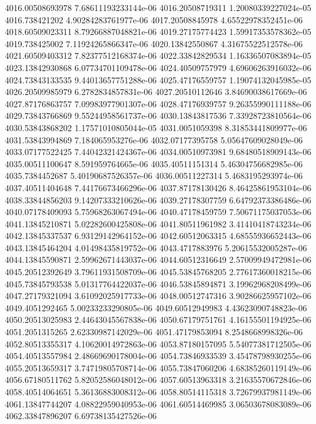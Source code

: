 {4016.00508693978 7.68611193233144e-06
4016.20508719311 1.20080339227024e-05
4016.738421202 4.90284283761977e-06
4017.20508845978 4.65522978352451e-06
4018.60509023311 8.79266887048821e-06
4019.27175774423 1.59917353578362e-05
4019.738425002 7.11924265866347e-06
4020.13842550867 4.31675522512578e-06
4021.60509403312 7.82377512168374e-06
4022.33842829534 1.16336507083894e-05
4023.13842930868 6.07734701109478e-06
4024.40509757979 4.69606263916032e-06
4024.73843133535 9.44013657751288e-06
4025.47176559757 1.19074132045985e-05
4026.20509985979 6.2782834857831e-06
4027.20510112646 3.84690038617669e-06
4027.87176863757 7.09983977901307e-06
4028.47176939757 9.26355990111188e-06
4029.73843766869 9.55244958561737e-06
4030.13843817536 7.33928723810564e-06
4030.53843868202 1.17571010805044e-05
4031.0051059398 8.31853441809977e-06
4031.53843994869 7.184065953276e-06
4032.07177395758 5.05647609028049e-06
4033.07177522425 7.44042321424367e-06
4034.00510973981 9.68480518909143e-06
4035.00511100647 8.591959764665e-06
4035.40511151314 5.46304756682985e-06
4035.7384452687 5.40190687526357e-06
4036.00511227314 5.4683195293974e-06
4037.40511404648 7.44176673466296e-06
4037.87178130426 8.46425861953104e-06
4038.33844856203 9.14207333210626e-06
4039.27178307759 6.64792373386486e-06
4040.07178409093 5.75968263067494e-06
4040.47178459759 7.50671175037053e-06
4041.13845210871 5.02282600425808e-06
4041.80511961982 3.41410418743234e-06
4042.13845337537 6.93129142964152e-06
4042.60512063315 4.68555936652443e-06
4043.13845464204 4.01498435819752e-06
4043.4717883976 5.20615532005287e-06
4044.13845590871 2.59962671443037e-06
4044.60512316649 2.57009949472981e-06
4045.20512392649 3.79611931508709e-06
4045.53845768205 2.77617360018215e-06
4045.73845793538 5.01317764422037e-06
4046.53845894871 3.19962968208499e-06
4047.27179321094 3.61092025917733e-06
4048.00512747316 3.90286625957102e-06
4049.4051292465 5.00233233290805e-06
4049.60512949983 4.43623090748823e-06
4050.20513025983 2.44643045567838e-06
4050.67179751761 4.16155501194925e-06
4051.2051315265 2.62330987142029e-06
4051.47179853094 8.2548668998326e-06
4052.80513355317 4.10620014972863e-06
4053.87180157095 5.54077381712505e-06
4054.40513557984 2.48669690178004e-06
4054.73846933539 3.45478798930255e-06
4055.20513659317 3.74719805708714e-06
4055.73847060206 4.68385260119149e-06
4056.67180511762 5.82052586048012e-06
4057.60513963318 3.21635570672846e-06
4058.40514064651 5.36136883008312e-06
4058.80514115318 3.72679937981149e-06
4061.13847744207 4.08822959040953e-06
4061.60514469985 3.06503678083089e-06
4062.33847896207 6.69738135427526e-06
}
